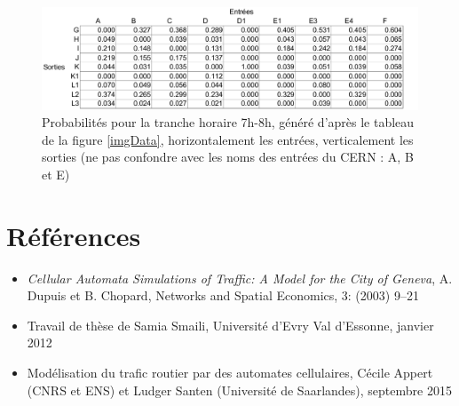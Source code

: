 \documentclass[a4paper,11pt, titlepage]{extarticle}
\begin{document}
\begin{figure}[!h]
  \begin{center}
    \includegraphics[width=16cm]{images/donneesInitialesProba.png}
  \end{center}
  \caption{Probabilités pour la tranche horaire 7h-8h, généré d'après le tableau de la figure \ref{imgData}, horizontalement les entrées, verticalement les sorties (ne pas confondre avec les noms des entrées du CERN : A, B et E)}
  \label{imgDataProba}
\end{figure}

\section{Références}

\begin{itemize}
\item \emph{Cellular Automata Simulations of Traffic: A Model for the City of Geneva}, A. Dupuis et B. Chopard, Networks and Spatial Economics, 3: (2003) 9–21
\item Travail de thèse de Samia Smaili, Université d'Evry Val d'Essonne, janvier 2012
\item Modélisation du trafic routier par des automates cellulaires, Cécile Appert (CNRS et ENS) et Ludger Santen (Université de Saarlandes), septembre 2015
\end{itemize}
\end{document}
